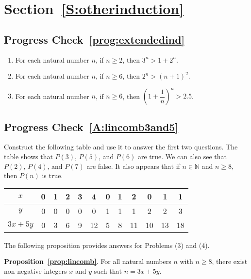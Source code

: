 \section*{Section~\ref{S:otherinduction}}

\subsection*{Progress Check~\ref{prog:extendedind}} 
\begin{enumerate}
\item For each natural number $n$, if $n \geq 2$, then $3^n > 1 + 2^n$.
\item For each natural number $n$, if $n \geq 6$, then $2^n > (n + 1 )^2$.
\item For each natural number $n$, if $n \geq 6$, then $\left( 1 + \dfrac{1}{n} \right)^n > 2.5$.
\end{enumerate}



\subsection*{Progress Check~\ref{A:lincomb3and5}}
Construct the following table and use it to answer the first two questions.  The table shows that  $P\left( 3 \right)$, $P\left( 5 \right)$, and  $P\left( 6 \right)$ are true.  We can also see that $P(2)$, $P(4)$, and $P(7)$ are false.  It also appears that if  $n \in \mathbb{N}$ and $n \geq 8$, then  $P\left( n \right)$ is true.

\begin{tabular}[t]{| c | c | c | c | c | c | c | c | c | c | c | c |} \hline
$x$       & 0 & 1 & 2 & 3 & 4 & 0 & 1 & 2 & 0 & 1 & 1  \\ \hline
$y$       & 0 & 0 & 0 & 0 & 0 & 1 & 1 & 1 & 2 & 2 & 3  \\ \hline
$3x + 5y$ & 0 & 3 & 6 & 9 & 12 & 5 & 8 & 11 & 10 & 13 & 18 \\ \hline
\end{tabular}

\vskip6pt
\noindent
The following proposition provides answers for Problems (3) and (4).

\vskip6pt
\noindent
\textbf{Proposition~\ref{prop:lincomb}}.  For all natural numbers  $n$  with  $n \geq 8$, there exist non-negative integers  $x$  and  $y$  such that  $n = 3x + 5y$.

